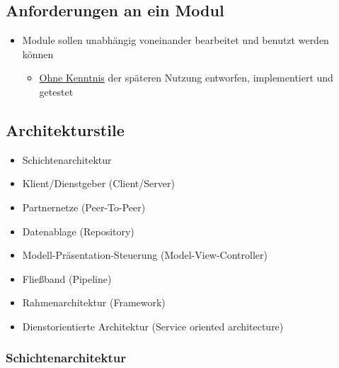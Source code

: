	\subsection{Anforderungen an ein Modul}
	
		\begin{itemize}
			\item Module sollen unabhängig voneinander bearbeitet und benutzt werden können
			\begin{itemize}
				\item \underline{Ohne Kenntnis} der späteren Nutzung entworfen, implementiert und getestet
			\end{itemize}
		\end{itemize}
		
	\newpage
	\subsection{Architekturstile}
			
		\begin{itemize}
			\item Schichtenarchitektur
			\item Klient/Dienstgeber (Client/Server)
			\item Partnernetze (Peer-To-Peer)
			\item Datenablage (Repository)
			\item Modell-Präsentation-Steuerung (Model-View-Controller)
			\item Fließband (Pipeline)
			\item Rahmenarchitektur (Framework)
			\item Dienstorientierte Architektur (Service oriented architecture)
		\end{itemize}
				
		\subsubsection{Schichtenarchitektur}
					
